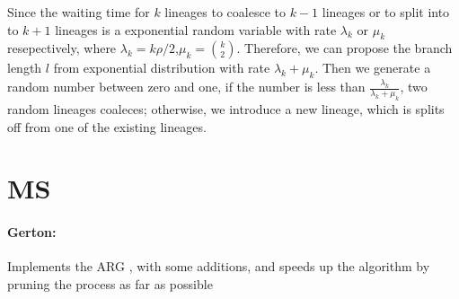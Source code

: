 Since the waiting time for $k$ lineages to coalesce to $k-1$ lineages or to split into to $k+1$ lineages is a exponential random variable with rate $\lambda_k$ or $\mu_k$ resepectively, where $\lambda_k=k\rho/2$,$\mu_k=\binom{k}{2}$. Therefore, we can propose the branch length $l$ from exponential distribution with rate $\lambda_k+\mu_k$. Then we generate a random number between zero and one, if the number is less than $\frac{\lambda_k}{\lambda_k+\mu_k}$, two random lineages coaleces; otherwise, we introduce a new lineage, which is splits off from one of the existing lineages.

\section{MS \citep{Hudson2002ms}}
{\color{red}
\paragraph{Gerton:}Implements the ARG \citep{Griffiths1997ARG}, with some additions, and speeds up the algorithm by pruning the process as far as possible 
}

